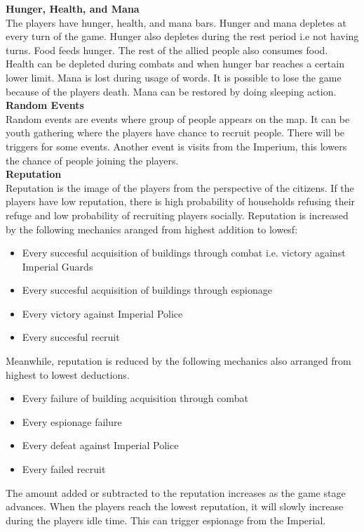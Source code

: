 \documentclass[11pt]{article}
\begin{document}
\textbf{Hunger, Health, and Mana}\\
The players have hunger, health, and mana bars. Hunger and mana depletes at every turn of the game. Hunger also depletes during the rest period i.e not having turns. Food feeds hunger. The rest of the allied people also consumes food. Health can be depleted during combats and when hunger bar reaches a certain lower limit. Mana is lost  during usage of words. It is possible to lose the game because of the players death. Mana can be restored by doing sleeping action.\\

\textbf{Random Events}\\
Random events are events where group of people appears on the map. It can be youth gathering where the players have chance to recruit people. There will be triggers for some events. Another event is visits from the Imperium, this lowers the chance of people joining the players.\\

\textbf{Reputation}\\
Reputation is the image of the players from the perspective of the citizens. If the players have low reputation, there is high probability of households refusing their refuge and low probability of recruiting players socially.
Reputation is increased by the following mechanics aranged from highest addition to lowesf:\\
\begin{itemize}
\item
  Every succesful acquisition of buildings through combat i.e. victory against Imperial Guards 
\item
  Every succesful acquisition of buildings through espionage
\item
  Every victory against Imperial Police
\item
  Every succesful recruit
\end{itemize}
Meanwhile, reputation is reduced by the following mechanics also arranged from highest to lowest deductions.
\begin{itemize}
\item
  Every failure of building acquisition through combat
\item
  Every espionage failure
\item
  Every defeat against Imperial Police
\item
  Every failed recruit
\end{itemize}
The amount added or subtracted to the reputation increases as the game stage advances. When the players reach the lowest reputation, it will slowly increase during the players idle time. This can trigger espionage from the Imperial.
\end{document}
